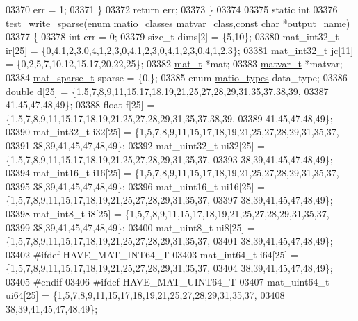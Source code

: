 \begin{DoxyCode}
{{{{{{{{{{{{{{{{{{{{{{{{{{{{{{{{{{{{{{{{{{{{{{{{{{{{{{{{{{{{03370         err = 1;
03371     \}
03372     \textcolor{keywordflow}{return} err;
03373 \}
03374 
03375 \textcolor{keyword}{static} \textcolor{keywordtype}{int}
03376 test\_write\_sparse(\textcolor{keyword}{enum} \hyperlink{group___m_a_t_gad4d60ae7b709fc81bfd744fb4c857c40}{matio\_classes} matvar\_class,\textcolor{keyword}{const} \textcolor{keywordtype}{char} *output\_name)
03377 \{
03378     \textcolor{keywordtype}{int}    err = 0;
03379     \textcolor{keywordtype}{size\_t} dims[2] = \{5,10\};
03380     mat\_int32\_t  ir[25] = \{0,4,1,2,3,0,4,1,2,3,0,4,1,2,3,0,4,1,2,3,0,4,1,2,3\};
03381     mat\_int32\_t  jc[11] = \{0,2,5,7,10,12,15,17,20,22,25\};
03382     \hyperlink{struct__mat__t}{mat\_t} *mat;
03383     \hyperlink{group___m_a_t_structmatvar__t}{matvar\_t} *matvar;
03384     \hyperlink{group___m_a_t_structmat__sparse__t}{mat\_sparse\_t}  sparse = \{0,\};
03385     \textcolor{keyword}{enum} \hyperlink{group___m_a_t_gacf7b3b879282b7ab3a51190e49bf3453}{matio\_types} data\_type;
03386     \textcolor{keywordtype}{double}    d[25] = \{1,5,7,8,9,11,15,17,18,19,21,25,27,28,29,31,35,37,38,39,
03387                        41,45,47,48,49\};
03388     \textcolor{keywordtype}{float}     f[25] = \{1,5,7,8,9,11,15,17,18,19,21,25,27,28,29,31,35,37,38,39,
03389                        41,45,47,48,49\};
03390     mat\_int32\_t   i32[25] = \{1,5,7,8,9,11,15,17,18,19,21,25,27,28,29,31,35,37,
03391                              38,39,41,45,47,48,49\};
03392     mat\_uint32\_t ui32[25] = \{1,5,7,8,9,11,15,17,18,19,21,25,27,28,29,31,35,37,
03393                              38,39,41,45,47,48,49\};
03394     mat\_int16\_t   i16[25] = \{1,5,7,8,9,11,15,17,18,19,21,25,27,28,29,31,35,37,
03395                              38,39,41,45,47,48,49\};
03396     mat\_uint16\_t ui16[25] = \{1,5,7,8,9,11,15,17,18,19,21,25,27,28,29,31,35,37,
03397                              38,39,41,45,47,48,49\};
03398     mat\_int8\_t    i8[25] = \{1,5,7,8,9,11,15,17,18,19,21,25,27,28,29,31,35,37,
03399                             38,39,41,45,47,48,49\};
03400     mat\_uint8\_t  ui8[25] = \{1,5,7,8,9,11,15,17,18,19,21,25,27,28,29,31,35,37,
03401                             38,39,41,45,47,48,49\};
03402 \textcolor{preprocessor}{#ifdef HAVE\_MAT\_INT64\_T}
03403     mat\_int64\_t i64[25] = \{1,5,7,8,9,11,15,17,18,19,21,25,27,28,29,31,35,37,
03404                            38,39,41,45,47,48,49\};
03405 \textcolor{preprocessor}{#endif}
03406 \textcolor{preprocessor}{#ifdef HAVE\_MAT\_UINT64\_T}
03407     mat\_uint64\_t ui64[25] = \{1,5,7,8,9,11,15,17,18,19,21,25,27,28,29,31,35,37,
03408                              38,39,41,45,47,48,49\};
}}}}}}}}}}}}}}}}}}}}}}}}}}}}}}}}}}}}}}}}}}}}}}}}}}}}}}}}}}}}
\end{DoxyCode}
